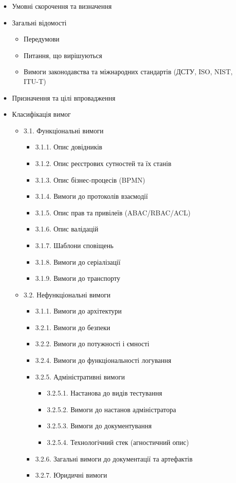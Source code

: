 \documentclass{article}
\begin{document}
\begin{itemize}
\item Умовні скорочення та визначення
\item Загальні відомості
  \begin{itemize}
  \item Передумови
  \item Питання, що вирішуються
  \item Вимоги законодавства та міжнародних стандартів (ДСТУ, ISO, NIST, ITU-T)
  \end{itemize}
\item Призначення та цілі впровадження
\item Класифікація вимог
  \begin{itemize}
  \item 3.1. Функціональні вимоги
    \begin{itemize}
    \item 3.1.1. Опис довідників
    \item 3.1.2. Опис реєстрових сутностей та їх станів
    \item 3.1.3. Опис бізнес-процесів (BPMN)
    \item 3.1.4. Вимоги до протоколів взаємодії
    \item 3.1.5. Опис прав та привілеїв (ABAC/RBAC/ACL)
    \item 3.1.6. Опис валідацій
    \item 3.1.7. Шаблони сповіщень
    \item 3.1.8. Вимоги до серіалізації
    \item 3.1.9. Вимоги до транспорту
    \end{itemize}
  \item 3.2. Нефункціональні вимоги
    \begin{itemize}
    \item 3.1.1. Вимоги до архітектури
    \item 3.2.1. Вимоги до безпеки
    \item 3.2.2. Вимоги до потужності і ємності
    \item 3.2.4. Вимоги до функціональності логування
    \item 3.2.5. Адміністративні вимоги
      \begin{itemize}
      \item 3.2.5.1. Настанова до видів тестування
      \item 3.2.5.2. Вимоги до настанов адміністратора
      \item 3.2.5.3. Вимоги до документування
      \item 3.2.5.4. Технологічний стек (агностичний опис)
      \end{itemize}
    \item 3.2.6. Загальні вимоги до документації та артефактів
    \item 3.2.7. Юридичні вимоги
    \end{itemize}
  \end{itemize}
\end{itemize}
\end{document}
